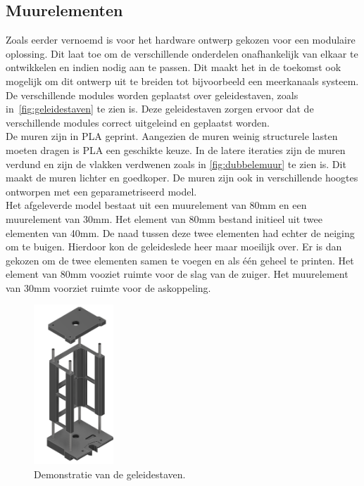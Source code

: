 \subsection{Muurelementen}
Zoals eerder vernoemd is voor het hardware ontwerp gekozen voor een modulaire oplossing. Dit laat toe om de verschillende onderdelen onafhankelijk van elkaar te ontwikkelen en indien nodig aan te passen. Dit maakt het in de toekomst ook mogelijk om dit ontwerp uit te breiden tot bijvoorbeeld een meerkanaals systeem. De verschillende modules worden geplaatst over geleidestaven, zoals in\ \autoref{fig:geleidestaven} te zien is. Deze geleidestaven zorgen ervoor dat de verschillende modules correct uitgeleind en geplaatst worden.
\\[12pt]De muren zijn in PLA geprint. Aangezien de muren weinig structurele lasten moeten dragen is PLA een geschikte keuze. In de latere iteraties zijn de muren verdund en zijn de vlakken verdwenen zoals in \autoref{fig:dubbelemuur} te zien is. Dit maakt de muren lichter en goedkoper. De muren zijn ook in verschillende hoogtes ontworpen met een geparametriseerd model. 
\\[12pt]Het afgeleverde model bestaat uit een muurelement van 80mm en een muurelement van 30mm. Het element van 80mm bestand initieel uit twee elementen van 40mm. De naad tussen deze twee elementen had echter de neiging om te buigen. Hierdoor kon de geleideslede heer maar moeilijk over. Er is dan gekozen om de twee elementen samen te voegen en als één geheel te printen. Het element van 80mm vooziet ruimte voor de slag van de zuiger. Het muurelement van 30mm voorziet ruimte voor de askoppeling.
\\[12pt]\begin{minipage}[t]{0.49\textwidth}
    \vspace{0pt}
    \begin{figure}[H]
        \centering
        \includegraphics[height=6cm]{figures/GuidesDemonstration_2.png}
        \caption{Demonstratie van de geleidestaven.}\label{fig:geleidestaven}
    \end{figure}
\end{minipage}
